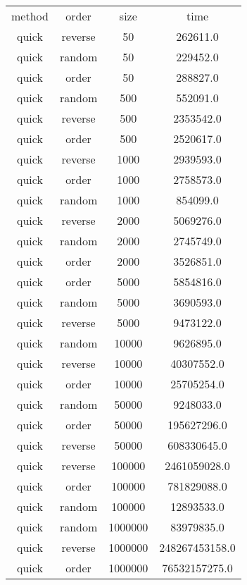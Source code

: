 \begin{table}
\begin{tabular}{cccc}
method & order & size & time \\
quick & reverse & 50 & 262611.0 \\
quick & random & 50 & 229452.0 \\
quick & order & 50 & 288827.0 \\
quick & random & 500 & 552091.0 \\
quick & reverse & 500 & 2353542.0 \\
quick & order & 500 & 2520617.0 \\
quick & reverse & 1000 & 2939593.0 \\
quick & order & 1000 & 2758573.0 \\
quick & random & 1000 & 854099.0 \\
quick & reverse & 2000 & 5069276.0 \\
quick & random & 2000 & 2745749.0 \\
quick & order & 2000 & 3526851.0 \\
quick & order & 5000 & 5854816.0 \\
quick & random & 5000 & 3690593.0 \\
quick & reverse & 5000 & 9473122.0 \\
quick & random & 10000 & 9626895.0 \\
quick & reverse & 10000 & 40307552.0 \\
quick & order & 10000 & 25705254.0 \\
quick & random & 50000 & 9248033.0 \\
quick & order & 50000 & 195627296.0 \\
quick & reverse & 50000 & 608330645.0 \\
quick & reverse & 100000 & 2461059028.0 \\
quick & order & 100000 & 781829088.0 \\
quick & random & 100000 & 12893533.0 \\
quick & random & 1000000 & 83979835.0 \\
quick & reverse & 1000000 & 248267453158.0 \\
quick & order & 1000000 & 76532157275.0 \\
\end{tabular}
\end{table}
